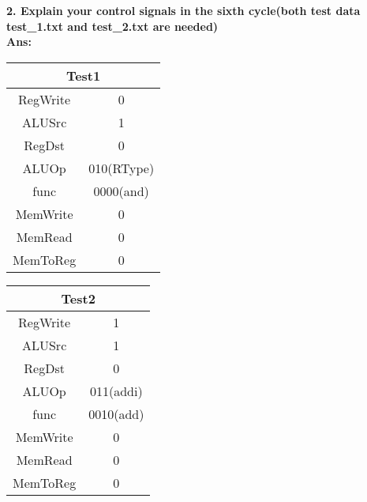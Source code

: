 \documentclass[a4paper, 12pt]{article}
\begin{document}
\newpage
{\bf 2. Explain your control signals in the sixth cycle(both test data test\_1.txt and test\_2.txt are needed)}\\
{\bf Ans: }\par
\begin{center}
    \begin{tabular}{|c|c|}
        \multicolumn{2}{c}{\bf Test1} \\
        \hline
        RegWrite & 0                  \\
        \hline
        ALUSrc   & 1                  \\
        \hline
        RegDst   & 0                  \\
        \hline
        ALUOp    & 010(RType)         \\
        \hline
        func     & 0000(and)          \\
        \hline
        MemWrite & 0                  \\
        \hline
        MemRead  & 0                  \\
        \hline
        MemToReg & 0                  \\
        \hline
    \end{tabular}
    \begin{tabular}{|c|c|}
        \multicolumn{2}{c}{\bf Test2} \\
        \hline
        RegWrite & 1                  \\
        \hline
        ALUSrc   & 1                  \\
        \hline
        RegDst   & 0                  \\
        \hline
        ALUOp    & 011(addi)          \\
        \hline
        func     & 0010(add)          \\
        \hline
        MemWrite & 0                  \\
        \hline
        MemRead  & 0                  \\
        \hline
        MemToReg & 0                  \\
        \hline
    \end{tabular}
\end{center}
\end{document}
